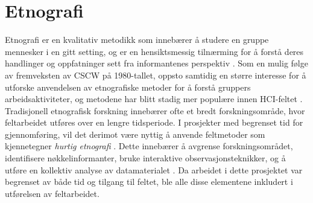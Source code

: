 \section{Etnografi}
\label{section:etnografi} 

Etnografi er en kvalitativ metodikk som innebærer å studere en gruppe mennesker i en gitt setting, og er en hensiktsmessig tilnærming for å forstå deres handlinger og oppfatninger sett fra informantenes perspektiv \citep{Blomberg93, Reeves08, Nardi97}. Som en mulig følge av fremveksten av CSCW på 1980-tallet, oppsto samtidig en større interesse for å utforske anvendelsen av etnografiske metoder for å forstå gruppers arbeidsaktiviteter, og metodene har blitt stadig mer populære innen HCI-feltet \citep{Blomberg93, Millen00}. Tradisjonell etnografisk forskning innebærer ofte et bredt forskningsområde, hvor feltarbeidet utføres over en lengre tidsperiode. I prosjekter med begrenset tid for gjennomføring, vil det derimot være nyttig å anvende feltmetoder som kjennetegner \textit{hurtig etnografi} \citep{Millen00}. Dette innebærer å avgrense forskningsområdet, identifisere nøkkelinformanter, bruke interaktive observasjonsteknikker, og å utføre en kollektiv analyse av datamaterialet . Da arbeidet i dette prosjektet var begrenset av både tid og tilgang til feltet, ble alle disse elementene inkludert i utførelsen av feltarbeidet.




